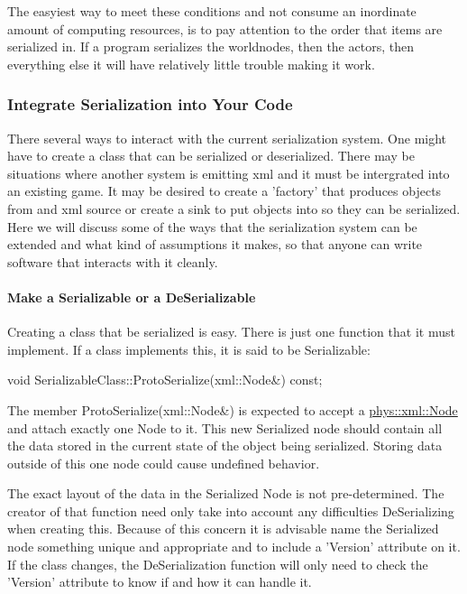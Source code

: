 The easyiest way to meet these conditions and not consume an inordinate amount of computing resources, is to pay attention to the order that items are serialized in. If a program serializes the worldnodes, then the actors, then everything else it will have relatively little trouble making it work. \hypertarget{Serialization_serializationintegration}{}\subsubsection{Integrate Serialization into Your Code}\label{Serialization_serializationintegration}
There several ways to interact with the current serialization system. One might have to create a class that can be serialized or deserialized. There may be situations where another system is emitting xml and it must be intergrated into an existing game. It may be desired to create a 'factory' that produces objects from and xml source or create a sink to put objects into so they can be serialized. Here we will discuss some of the ways that the serialization system can be extended and what kind of assumptions it makes, so that anyone can write software that interacts with it cleanly. \hypertarget{Serialization_serializationmaking}{}\paragraph{Make a Serializable or a DeSerializable}\label{Serialization_serializationmaking}
Creating a class that be serialized is easy. There is just one function that it must implement. If a class implements this, it is said to be Serializable: 
\begin{DoxyCode}
 void SerializableClass::ProtoSerialize(xml::Node&) const;
\end{DoxyCode}
 The member ProtoSerialize(xml::Node\&) is expected to accept a \hyperlink{classphys_1_1xml_1_1Node}{phys::xml::Node} and attach exactly one Node to it. This new Serialized node should contain all the data stored in the current state of the object being serialized. Storing data outside of this one node could cause undefined behavior. \par
 \par
 The exact layout of the data in the Serialized Node is not pre-\/determined. The creator of that function need only take into account any difficulties DeSerializing when creating this. Because of this concern it is advisable name the Serialized node something unique and appropriate and to include a 'Version' attribute on it. If the class changes, the DeSerialization function will only need to check the 'Version' attribute to know if and how it can handle it. \par
